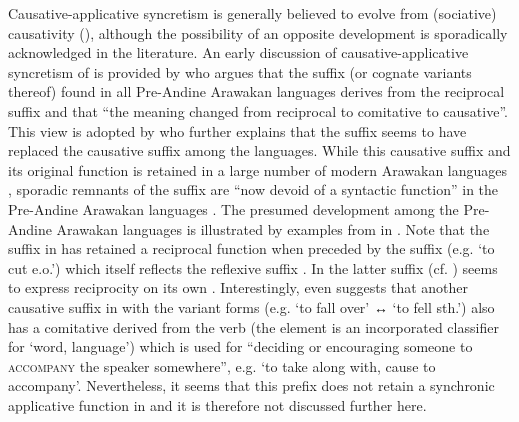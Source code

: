 Causative-applicative syncretism is generally believed to evolve from (sociative) causativity (), although the possibility of an opposite development is sporadically acknowledged in the literature. An early discussion of causative-applicative syncretism of  is provided by \cite[110]{wise:1990} who argues that the suffix  (or cognate variants thereof) found in all Pre-Andine Arawakan languages derives from the  reciprocal suffix  and that “the meaning changed from reciprocal to comitative to causative”. This view is adopted by \cite[501ff.]{payne:2002} who further explains that the suffix seems to have replaced the causative suffix  among the languages. While this causative suffix and its original function is retained in a large number of modern Arawakan languages \citep[103]{wise:1990}, sporadic remnants of the suffix are “now devoid of a syntactic function” in the Pre-Andine Arawakan languages \citep[501]{payne:2002}. The presumed development among the Pre-Andine Arawakan languages is illustrated by examples from  in  \citep[491f., 501]{payne:2002}. Note that the suffix  in  has retained a reciprocal function when preceded by the suffix  (e.g.  ‘to cut e.o.’) which itself reflects the  reflexive suffix  \citep[109f.]{wise:1990}. In  the latter suffix (cf. ) seems to express reciprocity on its own \citep[130]{mihas:2010}. Interestingly, \cite[488, 504]{payne:2002} even suggests that another causative suffix in  with the variant forms  (e.g.  ‘to fall over’ ↔  ‘to fell sth.’) also has a comitative  derived from the verb  (the  element is an incorporated classifier for ‘word, language’) which is used for “deciding or encouraging someone to \textsc{accompany} the speaker somewhere”, e.g.   ‘to take along with, cause to accompany’. Nevertheless, it seems that this prefix does not retain a synchronic applicative function in  and it is therefore not discussed further here. 


